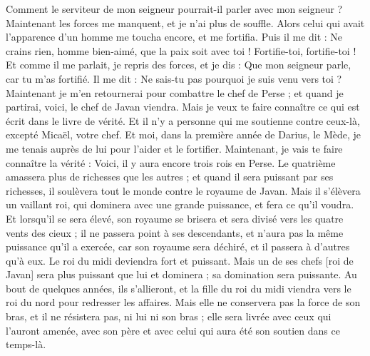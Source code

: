 \begin{multicols}{2}
Comment le serviteur de mon seigneur pourrait-il parler avec mon seigneur ? Maintenant les forces me manquent, et je n’ai plus de souffle.
Alors celui qui avait l’apparence d’un homme me toucha encore, et me fortifia.
Puis il me dit : Ne crains rien, homme bien-aimé, que la paix soit avec toi ! Fortifie-toi, fortifie-toi ! Et comme il me parlait, je repris des forces, et je dis : Que mon seigneur parle, car tu m'as fortifié.
Il me dit : Ne sais-tu pas pourquoi je suis venu vers toi ? Maintenant je m'en retournerai pour combattre le chef de Perse ; et quand je partirai, voici, le chef de Javan viendra.
Mais je veux te faire connaître ce qui est écrit dans le livre de vérité. Et il n'y a personne qui me soutienne contre ceux-là, excepté Micaël, votre chef.
\VerseOne{}Et moi, dans la première année de Darius, le Mède, je me tenais auprès de lui pour l’aider et le fortifier.
Maintenant, je vais te faire connaître la vérité : Voici, il y aura encore trois rois en Perse. Le quatrième amassera plus de richesses que les autres ; et quand il sera puissant par ses richesses, il soulèvera tout le monde contre le royaume de Javan.
Mais il s’élèvera un vaillant roi, qui dominera avec une grande puissance, et fera ce qu’il voudra.
Et lorsqu’il se sera élevé, son royaume se brisera et sera  divisé vers les quatre vents des cieux ; il ne passera point à ses descendants, et n’aura pas la même puissance qu’il a exercée, car son royaume sera déchiré, et il passera à d'autres qu’à eux.
Le roi du midi deviendra fort et puissant.  Mais un de ses chefs [roi de Javan] sera plus puissant que lui et dominera ; sa domination sera puissante.
Au bout de quelques années, ils s'allieront, et la fille du roi du midi viendra vers le roi du nord pour redresser les affaires. Mais elle ne conservera pas la force de son bras, et il ne résistera pas, ni lui ni son bras ; elle sera livrée avec ceux qui l’auront amenée, avec son père et avec celui qui aura été son soutien dans ce temps-là.

\end{multicols}
